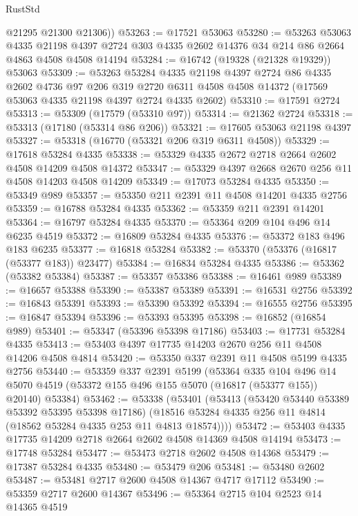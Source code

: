 \begin{lexlean}{RustStd}
\begin{coremodule}
{\begin{coremodule}
{{{{{{{{{{{{{{{{{{{{{{{{{{{{{{{{{{{{{{{{{{{{{{{{{{{{{{{        @21295
        @21300
        @21306))
@53263 := @17521 @53063
@53280 := @53263
    @53063
    @4335
    @21198
    @4397
    @2724
    @303
    @4335
    @2602
    @14376
    @34
    @214
    @86
    @2664
    @4863
    @4508
    @4508
    @14194
@53284 := @16742 (@19328 (@21328 @19329)) @53063
@53309 := @53263
    @53284
    @4335
    @21198
    @4397
    @2724
    @86
    @4335
    @2602
    @4736
    @97
    @206
    @319
    @2720
    @6311
    @4508
    @4508
    @14372
    (@17569 @53063 @4335 @21198 @4397 @2724 @4335 @2602)
@53310 := @17591 @2724
@53313 := @53309 (@17579 (@53310 @97))
@53314 := @21362 @2724
@53318 := @53313 (@17180 (@53314 @86 @206))
@53321 := @17605 @53063 @21198 @4397
@53327 := @53318 (@16770 (@53321 @206 @319 @6311 @4508))
@53329 := @17618 @53284 @4335
@53338 := @53329 @4335 @2672 @2718 @2664 @2602 @4508 @14209 @4508 @14372
@53347 := @53329 @4397 @2668 @2670 @256 @11 @4508 @14203 @4508 @14209
@53349 := @17073 @53284 @4335
@53350 := @53349 @989
@53357 := @53350 @211 @2391 @11 @4508 @14201 @4335 @2756
@53359 := @16788 @53284 @4335
@53362 := @53359 @211 @2391 @14201
@53364 := @16797 @53284 @4335
@53370 := @53364 @209 @104 @496 @14 @6235 @4519
@53372 := @16809 @53284 @4335
@53376 := @53372 @183 @496 @183 @6235
@53377 := @16818 @53284
@53382 := @53370 (@53376 (@16817 (@53377 @183)) @23477)
@53384 := @16834 @53284 @4335
@53386 := @53362 (@53382 @53384)
@53387 := @53357 @53386
@53388 := @16461 @989
@53389 := @16657 @53388
@53390 := @53387 @53389
@53391 := @16531 @2756
@53392 := @16843 @53391
@53393 := @53390 @53392
@53394 := @16555 @2756
@53395 := @16847 @53394
@53396 := @53393 @53395
@53398 := @16852 (@16854 @989)
@53401 := @53347 (@53396 @53398 @17186)
@53403 := @17731 @53284 @4335
@53413 := @53403 @4397 @17735 @14203 @2670 @256 @11 @4508 @14206 @4508 @4814
@53420 := @53350 @337 @2391 @11 @4508 @5199 @4335 @2756
@53440 := @53359
    @337
    @2391
    @5199
    (@53364
      @335
      @104
      @496
      @14
      @5070
      @4519
      (@53372 @155 @496 @155 @5070 (@16817 (@53377 @155)) @20140)
      @53384)
@53462 := @53338
    (@53401
      (@53413
        (@53420 @53440 @53389 @53392 @53395 @53398 @17186)
        (@18516 @53284 @4335 @256 @11 @4814 (@18562 @53284 @4335 @253 @11 @4813 @18574))))
@53472 := @53403 @4335 @17735 @14209 @2718 @2664 @2602 @4508 @14369 @4508 @14194
@53473 := @17748 @53284
@53477 := @53473 @2718 @2602 @4508 @14368
@53479 := @17387 @53284 @4335
@53480 := @53479 @206
@53481 := @53480 @2602
@53487 := @53481 @2717 @2600 @4508 @14367 @4717 @17112
@53490 := @53359 @2717 @2600 @14367
@53496 := @53364 @2715 @104 @2523 @14 @14365 @4519
}}}}}}}}}}}}}}}}}}}}}}}}}}}}}}}}}}}}}}}}}}}}}}}}}}}}}}}
\end{coremodule}}
\end{coremodule}
\end{lexlean}
